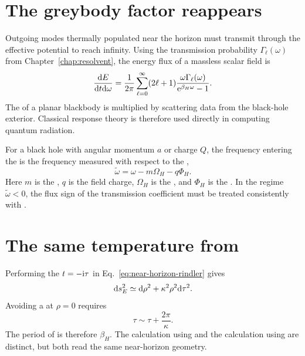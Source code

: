 \section{The greybody factor reappears}

Outgoing modes thermally populated near the horizon must transmit through the effective potential to reach infinity. Using the transmission probability $\Gamma_\ell(\omega)$ from Chapter~\ref{chap:resolvent}, the energy flux of a massless scalar field is
\begin{equation}
\frac{\mathrm{d} E}{\mathrm{d} t\mathrm{d}\omega}
=
\frac{1}{2\pi}
\sum_{\ell=0}^{\infty}
(2\ell+1)
\frac{
\omega\Gamma_\ell(\omega)
}{
\mathrm{e}^{\beta_H\omega}-1
}.
\label{eq:hawking-greybody-flux}
\end{equation}
The  of a planar blackbody is multiplied by scattering data from the black-hole exterior. Classical response theory is therefore used directly in computing quantum radiation.

For a black hole with angular momentum $a$ or charge $Q$, the frequency entering the  is the frequency measured with respect to the ,
\begin{equation}
\widetilde\omega
=
\omega-m\Omega_H-q\Phi_H.
\label{eq:horizon-effective-frequency}
\end{equation}
Here $m$ is the , $q$ is the field charge, $\Omega_H$ is the , and $\Phi_H$ is the . In the regime $\widetilde\omega<0$, the flux sign of the transmission coefficient must be treated consistently with .

\section{The same temperature from }

Performing the  $t=-\mathrm{i}\tau$ in Eq.~\eqref{eq:near-horizon-rindler} gives
\begin{equation}
\mathrm{d} s_E^2
\simeq
\mathrm{d}\rho^2
+\kappa^2\rho^2\mathrm{d}\tau^2.
\end{equation}
Avoiding a  at $\rho=0$ requires
\begin{equation}
\tau
\sim
\tau+\frac{2\pi}{\kappa}.
\label{eq:euclidean-period}
\end{equation}
The period of  is therefore $\beta_H$. The calculation using  and the calculation using  are distinct, but both read the same near-horizon geometry.

